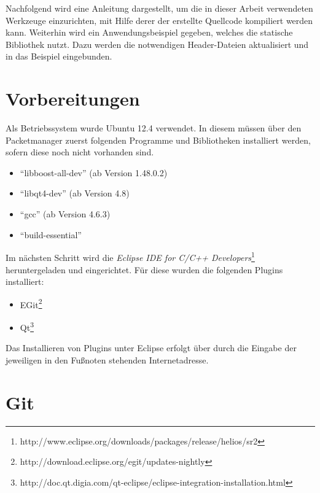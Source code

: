 Nachfolgend wird eine Anleitung dargestellt, um die in
dieser Arbeit verwendeten Werkzeuge einzurichten, mit Hilfe derer der
erstellte Quellcode kompiliert werden kann. Weiterhin wird ein Anwendungsbeispiel
gegeben, welches die statische Bibliothek nutzt. Dazu werden die notwendigen
Header-Dateien aktualisiert und in das Beispiel eingebunden.

\section{Vorbereitungen}

Als Betriebssystem wurde Ubuntu 12.4 verwendet. In diesem m{\"u}ssen
{\"u}ber den Packetmanager zuerst folgenden Programme und Bibliotheken installiert
werden, sofern diese noch nicht vorhanden sind.

\begin{itemize}
\item "`libboost-all-dev"' (ab Version 1.48.0.2) 
\item "`libqt4-dev"' (ab Version 4.8)
\item "`gcc"' (ab Version 4.6.3)
\item "`build-essential"'
\end{itemize}

Im n{\"a}chsten Schritt wird die \textit{Eclipse IDE for C/C++
Developers}\footnote{http://www.eclipse.org/downloads/packages/release/helios/sr2}
heruntergeladen und eingerichtet. F{\"u}r diese wurden die folgenden Plugins installiert:

\begin{itemize}
\item EGit\footnote{http://download.eclipse.org/egit/updates-nightly}
\item
Qt\footnote{http://doc.qt.digia.com/qt-eclipse/eclipse-integration-installation.html}
\end{itemize}

Das Installieren von Plugins unter Eclipse erfolgt {\"u}ber  durch die Eingabe der jeweiligen in den Fu{\ss}noten
stehenden Internetadresse.

\section{Git}

